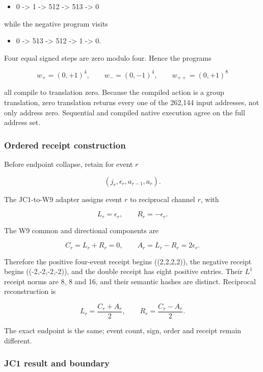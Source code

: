 \begin{itemize}
\tightlist
\item
  0 -\textgreater{} 1 -\textgreater{} 512 -\textgreater{} 513
  -\textgreater{} 0
\end{itemize}

while the negative program visits

\begin{itemize}
\tightlist
\item
  0 -\textgreater{} 513 -\textgreater{} 512 -\textgreater{} 1
  -\textgreater{} 0.
\end{itemize}

Four equal signed steps are zero modulo four. Hence the programs

\[
w_+=(0,+1)^4,
\qquad
w_-=(0,-1)^4,
\qquad
w_{++}=(0,+1)^8
\]

all compile to translation zero. Because the compiled action is a group
translation, zero translation returns every one of the 262,144 input
addresses, not only address zero. Sequential and compiled native
execution agree on the full address set.

\subsubsection{Ordered receipt
construction}\label{viii-ch11-ordered-receipt-construction}

Before endpoint collapse, retain for event \(r\)

\[
(j_r,\epsilon_r,a_{r-1},a_r).
\]

The JC1-to-W9 adapter assigns event \(r\) to reciprocal channel \(r\),
with

\[
L_r=\epsilon_r,
\qquad
R_r=-\epsilon_r.
\]

The W9 common and directional components are

\[
C_r=L_r+R_r=0,
\qquad
A_r=L_r-R_r=2\epsilon_r.
\]

Therefore the positive four-event receipt begins ((2,2,2,2)), the
negative receipt begins ((-2,-2,-2,-2)), and the double receipt has
eight positive entries. Their \(L^1\) receipt norms are 8, 8 and 16, and
their semantic hashes are distinct. Reciprocal reconstruction is

\[
L_r=\frac{C_r+A_r}{2},
\qquad
R_r=\frac{C_r-A_r}{2}.
\]

The exact endpoint is the same; event count, sign, order and receipt
remain different.

\subsubsection{JC1 result and boundary}\label{viii-ch11-jc1-result-and-boundary}

